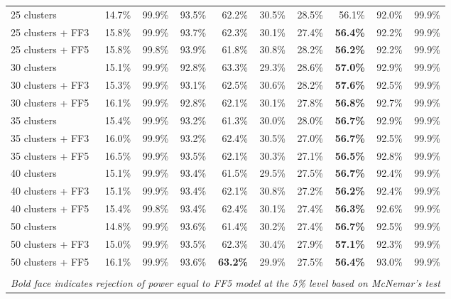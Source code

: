 \begin{table}[!h]
\begin{center}
\begin{tabular}{lrrrrrrrrr}
25 clusters	& 14.7\% & 99.9\% & 93.5\% & 62.2\% & 30.5\% & 28.5\% & 56.1\% & 92.0\% & 99.9\% \\
25 clusters + FF3	& 15.8\% & 99.9\% & 93.7\% & 62.3\% & 30.1\% & 27.4\% & \textbf{56.4\%} & 92.2\% & 99.9\% \\
25 clusters + FF5	& 15.8\% & 99.8\% & 93.9\% & 61.8\% & 30.8\% & 28.2\% & \textbf{56.2\%} & 92.2\% & 99.9\% \\
30 clusters	& 15.1\% & 99.9\% & 92.8\% & 63.3\% & 29.3\% & 28.6\% & \textbf{57.0\%} & 92.9\% & 99.9\% \\
30 clusters + FF3	& 15.3\% & 99.9\% & 93.1\% & 62.5\% & 30.6\% & 28.2\% & \textbf{57.6\%} & 92.5\% & 99.9\% \\
30 clusters + FF5	& 16.1\% & 99.9\% & 92.8\% & 62.1\% & 30.1\% & 27.8\% & \textbf{56.8\%} & 92.7\% & 99.9\% \\
35 clusters	& 15.4\% & 99.9\% & 93.2\% & 61.3\% & 30.0\% & 28.0\% & \textbf{56.7\%} & 92.9\% & 99.9\% \\
35 clusters + FF3	& 16.0\% & 99.9\% & 93.2\% & 62.4\% & 30.5\% & 27.0\% & \textbf{56.7\%} & 92.5\% & 99.9\% \\
35 clusters + FF5	& 16.5\% & 99.9\% & 93.5\% & 62.1\% & 30.3\% & 27.1\% & \textbf{56.5\%} & 92.8\% & 99.9\% \\
40 clusters	& 15.1\% & 99.9\% & 93.4\% & 61.5\% & 29.5\% & 27.5\% & \textbf{56.7\%} & 92.4\% & 99.9\% \\
40 clusters + FF3	& 15.1\% & 99.9\% & 93.4\% & 62.1\% & 30.8\% & 27.2\% & \textbf{56.2\%} & 92.4\% & 99.9\% \\
40 clusters + FF5	& 15.4\% & 99.8\% & 93.4\% & 62.4\% & 30.1\% & 27.4\% & \textbf{56.3\%} & 92.6\% & 99.9\% \\
50 clusters	& 14.8\% & 99.9\% & 93.6\% & 61.4\% & 30.2\% & 27.4\% & \textbf{56.7\%} & 92.5\% & 99.9\% \\
50 clusters + FF3	& 15.0\% & 99.9\% & 93.5\% & 62.3\% & 30.4\% & 27.9\% & \textbf{57.1\%} & 92.3\% & 99.9\% \\
50 clusters + FF5	& 16.1\% & 99.9\% & 93.6\% & \textbf{63.2\%} & 29.9\% & 27.5\% & \textbf{56.4\%} & 93.0\% & 99.9\% \\
\hline\\
\multicolumn{10}{l}{\itshape Bold face indicates rejection of power equal to FF5 model at the 5\% level based on McNemar's test}
    \end{tabular}
    \end{center}
\end{table}
